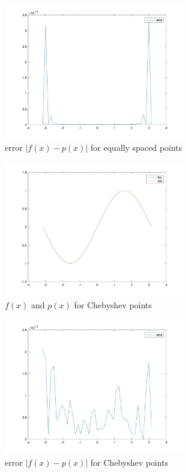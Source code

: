 \documentclass[11pt,fleqn]{exam}
\begin{document}
\begin{figure}[H]
  	\centering
  	\includegraphics[width=0.7\textwidth]{q7_b}
  	\caption{error $|f(x) - p(x)|$ for equally spaced points}
\end{figure}

\begin{figure}[H]
  	\centering
  	\includegraphics[width=0.7\textwidth]{q7_c_1}
  	\caption{$f(x)$ and $p(x)$ for Chebyshev points}
\end{figure}

\begin{figure}[H]
  	\centering
  	\includegraphics[width=0.7\textwidth]{q7_c_2}
  	\caption{error $|f(x) - p(x)|$ for Chebyshev points}
\end{figure}
\end{document}
